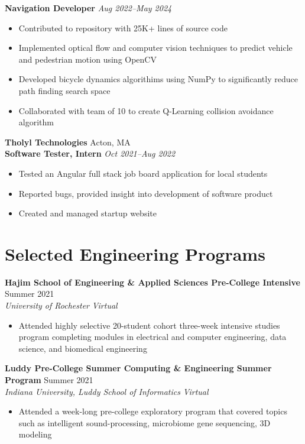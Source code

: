 \documentclass[letterpaper,10pt]{article}
\newcommand{\company}[2]{
    \vspace{6pt}
    {\large \textbf{#1}}
    \hfill
    {\normalsize {#2}}
    \\
}
\newcommand{\position}[2]{
    \vspace{4pt}
    {\normalsize \textbf {#1}}
    \hfill
    {\normalsize \textit{#2}}
    \\
}
\newcommand{\resumeEntry}[4]{
    \vspace{4pt}
    {\large \textbf{#1}}
    \hfill
    {\normalsize #2}
    \\
    \textit{#3} \hfill \textit{#4}
    \vspace{1pt}
}
\newcommand{\itemsBegin}{
    \begin{itemize}[leftmargin=0.2in, labelsep=0.05in, itemsep=0pt, parsep=1pt, topsep=0pt, partopsep=0pt]
}
\newcommand{\itemsEnd}{\end{itemize}}
\begin{document}
    \position{Navigation Developer}{Aug 2022--May 2024}
    \itemsBegin{}
        \item Contributed to repository with 25K+ lines of source code
        \item Implemented optical flow and computer vision techniques to predict vehicle and pedestrian motion using OpenCV
        \item Developed bicycle dynamics algorithims using NumPy to significantly reduce path finding search space
        \item Collaborated with team of 10 to create Q-Learning collision avoidance algorithm
    \itemsEnd{}

    \company{Tholyl Technologies}{Acton, MA}

    \position{Software Tester, Intern}{Oct 2021--Aug 2022}
    \itemsBegin
        \item Tested an Angular full stack job board application for local students
        \item Reported bugs, provided insight into development of software product
        \item Created and managed startup website
    \itemsEnd


\section{Selected Engineering Programs}


    \resumeEntry{Hajim School of Engineering \& Applied Sciences Pre-College Intensive}
        {Summer 2021}
        {University of Rochester}
        {Virtual}

    \itemsBegin{}
        \item Attended highly selective 20-student cohort three-week intensive studies program completing modules in electrical and computer engineering, data science, and biomedical engineering
    \itemsEnd{}

    \resumeEntry{Luddy Pre-College Summer Computing \& Engineering Summer Program}
        {Summer 2021}
        {Indiana University, Luddy School of Informatics}
        {Virtual}

    \itemsBegin{}
        \item Attended a week-long pre-college exploratory program that covered topics such as intelligent sound-processing, microbiome gene sequencing, 3D modeling
    \itemsEnd{}
\end{document}
